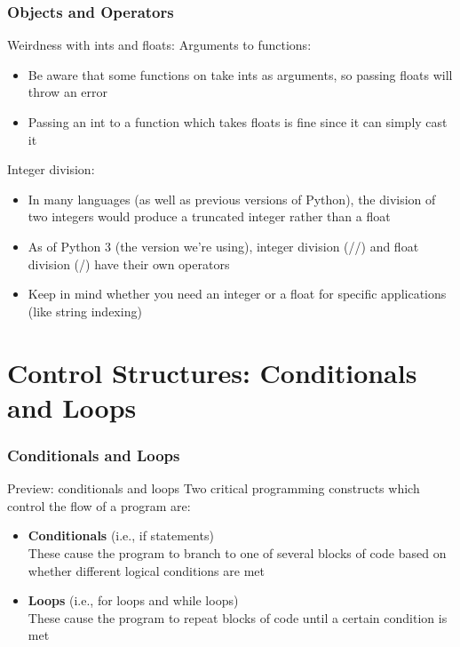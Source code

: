 \documentclass{beamer}
\begin{document}
\begin{frame}%
	\frametitle{Objects and Operators}
	
	\begin{block}{Weirdness with ints and floats:}
			Arguments to functions:
			\begin{itemize}
				\item Be aware that some functions on take ints as arguments, so passing floats will throw an error
				\item Passing an int to a function which takes floats is fine since it can simply cast it
			\end{itemize}
			
			\vspace{7pt}
			
			Integer division:
			\begin{itemize}
				\item In many languages (as well as previous versions of Python), the division of two integers would produce a truncated integer rather than a float
				\item As of Python 3 (the version we're using), integer division (//) and float division (/) have their own operators
				\item Keep in mind whether you need an integer or a float for specific applications (like string indexing)
			\end{itemize}
	\end{block}
	
\end{frame}


\section{Control Structures: Conditionals and Loops}

\begin{frame}	
\end{frame}

\begin{frame}%
	\frametitle{Conditionals and Loops}
	
	\begin{alertblock}{Preview: conditionals and loops}
			Two critical programming constructs which control the flow of a program are:
			\begin{itemize}
				\item \textbf{Conditionals} (i.e., if statements) \\
				These cause the program to branch to one of several blocks of code based on whether different logical conditions are met
				\item \textbf{Loops} (i.e., for loops and while loops) \\
				These cause the program to repeat blocks of code until a certain condition is met
			\end{itemize}
	\end{alertblock}
	
\end{frame}
\end{document}
